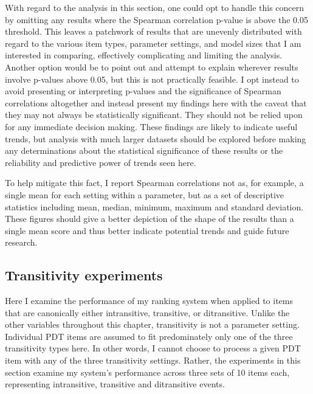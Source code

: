 With regard to the analysis in this section, one could opt to handle this concern by omitting any results where the Spearman correlation p-value is above the 0.05 threshold. This leaves a patchwork of results that are unevenly distributed with regard to the various item types, parameter settings, and model sizes that I am interested in comparing, effectively complicating and limiting the analysis. Another option would be to point out and attempt to explain wherever results involve p-values above 0.05, but this is not practically feasible. I opt instead to avoid presenting or interpreting p-values and the significance of Spearman correlations altogether and instead present my findings here with the caveat that they may not always be statistically significant. They should not be relied upon for any immediate decision making. These findings are likely to indicate useful trends, but analysis with much larger datasets should be explored before making any determinations about the statistical significance of these results or the reliability and predictive power of trends seen here.

To help mitigate this fact, I report Spearman correlations not as, for example, a single mean for each setting within a parameter, but as a set of descriptive statistics including mean, median, minimum, maximum and standard deviation. These figures should give a better depiction of the shape of the results than a single mean score and thus better indicate potential trends and guide future research.

\subsection{Transitivity experiments}
\label{sec:exp-transitivity}
Here I examine the performance of my ranking system when applied to items that are canonically either intransitive, transitive, or ditransitive. Unlike the other variables throughout this chapter, transitivity is not a parameter setting. Individual PDT items are assumed to fit predominately only one of the three transitivity types here. In other words, I cannot choose to process a given PDT item with any of the three transitivity settings. Rather, the experiments in this section examine my system's performance across three sets of 10 items each, representing intransitive, transitive and ditransitive events.



